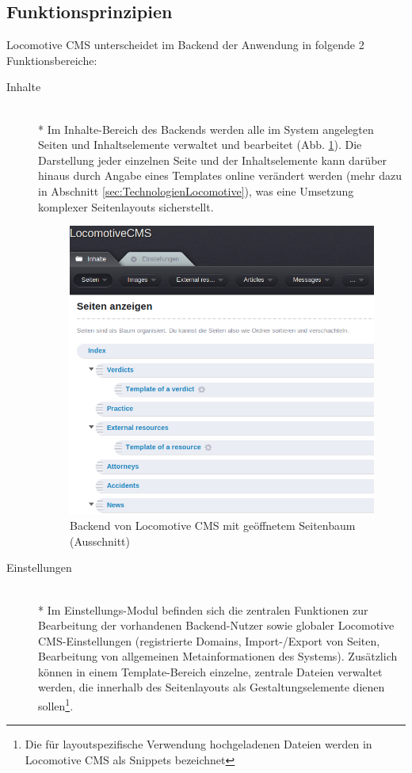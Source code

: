 \subsection{Funktionsprinzipien}
Locomotive CMS unterscheidet im Backend der Anwendung in folgende 2 Funktionsbereiche:
\begin{description}
\item[Inhalte]\mbox{~}\\*
Im Inhalte-Bereich des Backends werden alle im System angelegten Seiten und Inhaltselemente verwaltet und bearbeitet (Abb. \ref{locomotivebackend}). Die Darstellung jeder einzelnen Seite und der Inhaltselemente kann darüber hinaus durch Angabe eines Templates online verändert werden (mehr dazu in Abschnitt \ref{sec:TechnologienLocomotive}), was eine Umsetzung komplexer Seitenlayouts sicherstellt.
\begin{figure}[!h]
\begin{center}
\includegraphics[scale=0.6]{images/analyse/locomotive/backendlocomotive.png}
\caption{Backend von Locomotive CMS mit geöffnetem Seitenbaum (Ausschnitt)}
\label{locomotivebackend}
\end{center}
\end{figure}
\item[Einstellungen]\mbox{~}\\*
Im Einstellungs-Modul befinden sich die zentralen Funktionen zur Bearbeitung der vorhandenen Backend-Nutzer sowie globaler Locomotive CMS-Einstellungen (registrierte Domains, Import-/Export von Seiten, Bearbeitung von allgemeinen Metainformationen des Systems). Zusätzlich können in einem Template-Bereich einzelne, zentrale Dateien verwaltet werden, die innerhalb des Seitenlayouts als Gestaltungselemente dienen sollen\footnote{Die für layoutspezifische Verwendung hochgeladenen Dateien werden in Locomotive CMS als Snippets bezeichnet}.
\end{description}
